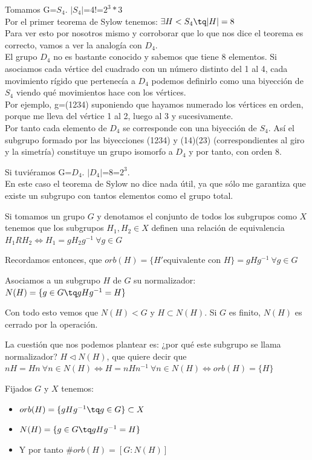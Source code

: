 \documentclass[nochap]{apuntes}
\begin{document}
\begin{example}
 Tomamos G=$S_4$. $|S_4|$=4!=$2^3*3$\\
 Por el primer teorema de Sylow tenemos: $\exists H < S_4 \tq |H|=8$\\
 Para ver esto por nosotros mismo y corroborar que lo que nos dice el teorema es correcto, vamos a ver la analogía con $D_4$.\\
 El grupo $D_4$  no es bastante conocido y sabemos que tiene 8 elementos. Si asociamos cada vértice del cuadrado con un número distinto
 del 1 al 4, cada movimiento rígido que pertenecía a $D_4$  podemos definirlo como una biyección de $S_4$  viendo qué movimientos hace
 con los vértices. \\
 Por ejemplo, g=(1234) suponiendo que hayamos numerado los vértices en orden, porque me lleva del vértice 1 al 2, luego al 3 y sucesivamente.\\
 Por tanto cada elemento de $D_4$  se corresponde con una biyección de $S_4$. Así el subgrupo formado por las biyecciones (1234) y (14)(23)
 (correspondientes al giro y la simetría) constituye un grupo isomorfo a $D_4$  y por tanto, con orden 8.
\end{example}

\begin{example}
 Si tuviéramos G=$D_4$. $|D_4|$=8=$2^3$.\\
 En este caso el teorema de Sylow no dice nada útil, ya que sólo me garantiza que existe un subgrupo con tantos elementos como el 
 grupo total.
\end{example}

Si tomamos un grupo $G$ y denotamos el conjunto de todos los subgrupos como $X$ tenemos que los subgrupos $H_1, H_2 \in X$ definen una relación de equivalencia $H_1RH_2 \iff H_1 = gH_2g^{-1} \ \forall g\in G$

Recordamos entonces, que $orb(H) = \{ H' \text{equivalente con }H \} = gHg^{-1}\ \forall g \in G$

Asociamos a un subgrupo $H$ de $G$ su normalizador:
$N(H) = \{ g\in G \tq gHg^{-1} = H \}$

Con todo esto vemos que $N(H)<G$ y $H\subset N(H)$. Si $G$ es finito, $N(H)$ es cerrado por la operación.

La cuestión que nos podemos plantear es: ¿por qué este subgrupo se llama normalizador?
\obs $H \lhd N(H)$, que quiere decir que $nH = Hn \ \forall n \in N(H) \iff H = nHn^{-1}\ \forall n \in N(H) \iff orb(H) = \{ H \}$

Fijados $G$ y $X$ tenemos:
\begin{itemize}
\item $orb(H) = \{gHg^{-1} \tq g\in G \} \subset X$
\item $N(H) = \{ g \in G \tq gHg^{-1} = H \}$
\item Y por tanto $\# orb(H) = [G:N(H)]$
\end{itemize}
\end{document}
